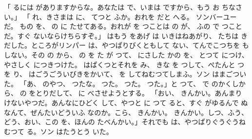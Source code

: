 \documentclass[a4paper,
tate,
book]
{jlreq}
\begin{document}
「 るには がありますからな。あなたは で、いまは ですから、もう お ちなさい。」
「 れ、きさまは に、  てつと ふか。おれを だと へる。  ソンバーユーだ。 もの を、 の に たせてある。おれが を つことは の が、 ふの で つことだ。すぐ ないならけちらすぞ。」 はもう をあげ は いきはねあがり、 たちは きだした。ところがリンパー は、やつぱりびくともして ない、てんでこつちを もしない。その の から、 の を た が つて、 にさした かの を、 とつて につけ、やさしく につきつけた。 はぱくつとそれを み、 きな を つして、ぺたんと つ を り、 はごうごういびきをかいて、 を してねむつてしまふ。ソン はまごついた。
「あ、 のやつ、  つたな。 つた。 つた。 つた。」と つて、 で のかくしから、 の をとりだして、 に べさせようとする。
「おい、 きんかい。あんまり けないやつだ。あんなにひどく して、やつと に つて ると、すぐ がゆるんで ぬなんて、ぜんたいどういふ なのか。こら、 きんかい。 きんかい。しつ、ふう、どう、おい、この を、ほんの たべんかい。」それでも は、やつぱりぐうぐうねむつて る。ソン はたうとう いた。
\end{document}
